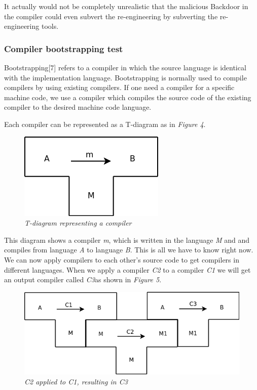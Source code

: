\documentclass[a4paper, 12pt]{article}
\begin{document}
It actually would not be completely unrealistic that the malicious Backdoor in the compiler could even subvert the re-engineering by subverting the re-engineering tools.

\subsubsection{Compiler bootstrapping test}

Bootstrapping[7] refers to a compiler in which the source language is identical with the implementation language. Bootstrapping is normally used to compile compilers by using existing compilers. If one need a compiler for a specific machine code, we use a compiler which compiles the source code of the existing compiler to the desired machine code language.

Each compiler can be represented as a T-diagram as in \emph{Figure 4}.

\begin{figure}[h]
\begin{center}
\includegraphics[keepaspectratio=true, scale=0.4]{T_diagram_sample.png}
\end{center}
\caption{\emph{T-diagram representing a compiler}}
\end{figure}

This diagram shows a compiler \emph{m}, which is written in the language \emph{M} and and compiles from language \emph{A} to language \emph{B}. This is all we have to know right now.
We can now apply compilers to each other's source code to get compilers in different languages. When we apply a compiler \emph{C2} to a compiler \emph{C1} we will get an output compiler called \emph{C3}as shown in \emph{Figure 5}.

\newpage

\begin{figure}[h]
\begin{center}
\includegraphics[keepaspectratio=true, scale=0.4]{T_diagram_apply.png}
\end{center}
\caption{\emph{C2 applied to C1, resulting in C3}}
\end{figure}
\end{document}
